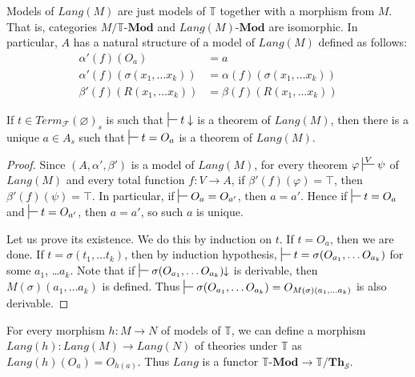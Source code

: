 \documentclass[reqno]{amsart}
\theoremstyle{definition}
\theoremstyle{remark}
\newcommand{\cat}[1]{\mathbf{#1}}
\newcommand{\Mod}[1]{#1\text{-}\cat{Mod}}
\newcommand{\Th}{\cat{Th}}
\numberwithin{figure}{section}
\begin{document}
Models of $Lang(M)$ are just models of $\mathbb{T}$ together with a morphism from $M$.
That is, categories $M/\Mod{\mathbb{T}}$ and $\Mod{Lang(M)}$ are isomorphic.
In particular, $A$ has a natural structure of a model of $Lang(M)$ defined as follows:
\begin{align*}
\alpha'(f)(O_a) & = a \\
\alpha'(f)(\sigma(x_1, \ldots x_k)) & = \alpha(f)(\sigma(x_1, \ldots x_k)) \\
\beta'(f)(R(x_1, \ldots x_k)) & = \beta(f)(R(x_1, \ldots x_k))
\end{align*}

\begin{lem}[cl-term]
If $t \in Term_\mathcal{F}(\varnothing)_s$ is such that $\sststile{}{} t \downarrow$ is a theorem of $Lang(M)$,
    then there is a unique $a \in A_s$ such that $\sststile{}{} t = O_a$ is a theorem of $Lang(M)$.
\end{lem}
\begin{proof}
Since $(A,\alpha',\beta')$ is a model of $Lang(M)$, for every theorem $\varphi \sststile{}{V} \psi$ of $Lang(M)$
    and every total function $f : V \to A$, if $\beta'(f)(\varphi) = \top$, then $\beta'(f)(\psi) = \top$.
In particular, if $\sststile{}{} O_a = O_{a'}$, then $a = a'$.
Hence if $\sststile{}{} t = O_a$ and $\sststile{}{} t = O_{a'}$, then $a = a'$, so such $a$ is unique.

Let us prove its existence.
We do this by induction on $t$.
If $t = O_a$, then we are done.
If $t = \sigma(t_1, \ldots t_k)$, then by induction hypothesis, $\sststile{}{} t = \sigma(O_{a_1}, \ldots O_{a_k})$ for some $a_1$, \ldots $a_k$.
Note that if $\sststile{}{} \sigma(O_{a_1}, \ldots O_{a_k})\!\!\downarrow$ is derivable, then $M(\sigma)(a_1, \ldots a_k)$ is defined.
Thus $\sststile{}{} \sigma(O_{a_1}, \ldots O_{a_k}) = O_{M(\sigma)(a_1, \ldots a_k)}$ is also derivable.
\end{proof}

For every morphism $h : M \to N$ of models of $\mathbb{T}$, we can define a morphism $Lang(h) : Lang(M) \to Lang(N)$ of theories under $\mathbb{T}$ as $Lang(h)(O_a) = O_{h(a)}$.
Thus $Lang$ is a functor $\Mod{\mathbb{T}} \to \mathbb{T}/\Th_\mathcal{S}$.
\end{document}
